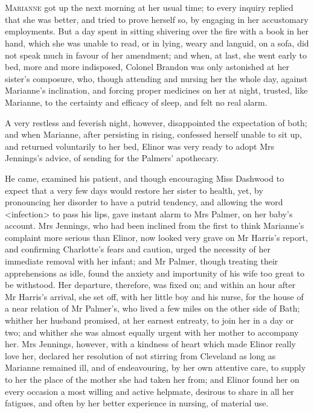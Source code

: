 \chapter[Chapter \thechapter]{}
\lettrine[lraise=0.3]{M}{arianne} got up the next morning at her usual time; to every inquiry replied that she was better, and tried to prove herself so, by engaging in her accustomary employments. But a day spent in sitting shivering over the fire with a book in her hand, which she was unable to read, or in lying, weary and languid, on a sofa, did not speak much in favour of her amendment; and when, at last, she went early to bed, more and more indisposed, Colonel Brandon was only astonished at her sister's composure, who, though attending and nursing her the whole day, against Marianne's inclination, and forcing proper medicines on her at night, trusted, like Marianne, to the certainty and efficacy of sleep, and felt no real alarm.

A very restless and feverish night, however, disappointed the expectation of both; and when Marianne, after persisting in rising, confessed herself unable to sit up, and returned voluntarily to her bed, Elinor was very ready to adopt Mrs Jennings's advice, of sending for the Palmers' apothecary.

He came, examined his patient, and though encouraging Miss Dashwood to expect that a very few days would restore her sister to health, yet, by pronouncing her disorder to have a putrid tendency, and allowing the word <infection> to pass his lips, gave instant alarm to Mrs Palmer, on her baby's account. Mrs Jennings, who had been inclined from the first to think Marianne's complaint more serious than Elinor, now looked very grave on Mr Harris's report, and confirming Charlotte's fears and caution, urged the necessity of her immediate removal with her infant; and Mr Palmer, though treating their apprehensions as idle, found the anxiety and importunity of his wife too great to be withstood. Her departure, therefore, was fixed on; and within an hour after Mr Harris's arrival, she set off, with her little boy and his nurse, for the house of a near relation of Mr Palmer's, who lived a few miles on the other side of Bath; whither her husband promised, at her earnest entreaty, to join her in a day or two; and whither she was almost equally urgent with her mother to accompany her. Mrs Jennings, however, with a kindness of heart which made Elinor really love her, declared her resolution of not stirring from Cleveland as long as Marianne remained ill, and of endeavouring, by her own attentive care, to supply to her the place of the mother she had taken her from; and Elinor found her on every occasion a most willing and active helpmate, desirous to share in all her fatigues, and often by her better experience in nursing, of material use.

